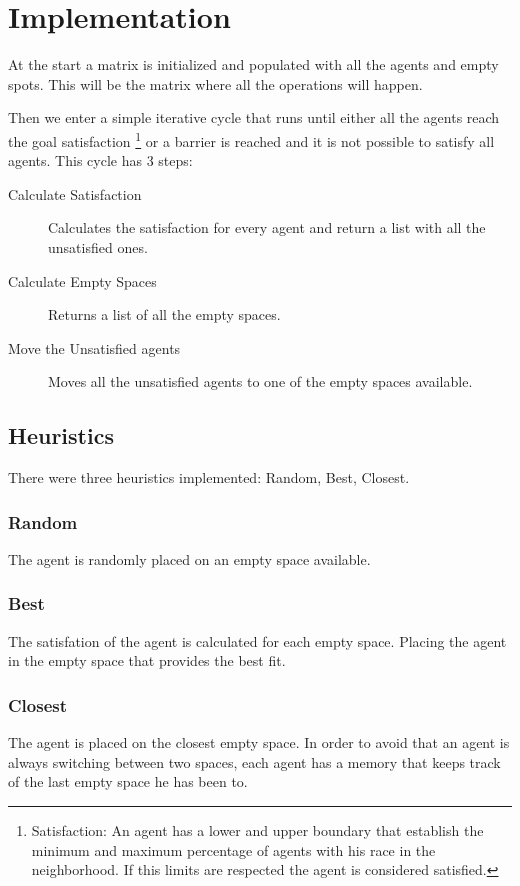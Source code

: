 \documentclass[a4paper,titlepage,11pt]{article}
\begin{document}
\newpage

\section{Implementation}
At the start a matrix is initialized and populated with all the agents and empty spots.
This will be the matrix where all the operations will happen.

Then we enter a simple iterative cycle that runs until either all the agents reach the goal satisfaction
\footnote{Satisfaction: An agent has a lower and upper boundary that establish the minimum and maximum
percentage of agents with his race in the neighborhood. If this limits are respected the agent is considered
satisfied.}
or a barrier is reached and it is not possible to satisfy all agents. This cycle has 3 steps:

\begin{description}
\item [ Calculate Satisfaction ] Calculates the satisfaction for every agent and return a list with all the unsatisfied ones.
\item [ Calculate Empty Spaces ] Returns a list of all the empty spaces.
\item [ Move the Unsatisfied agents ] Moves all the unsatisfied agents to one of the empty spaces available.
\end{description}

\subsection{Heuristics}
There were three heuristics implemented: Random, Best, Closest.

\subsubsection{Random}
The agent is randomly placed on an empty space available.

\subsubsection{Best}
The satisfation of the agent is calculated for each empty space.
Placing the agent in the empty space that provides the best fit.

\subsubsection{Closest}
The agent is placed on the closest empty space.
In order to avoid that an agent is always switching between two spaces,
each agent has a memory that keeps track of the last empty space he has been to.
\end{document}
